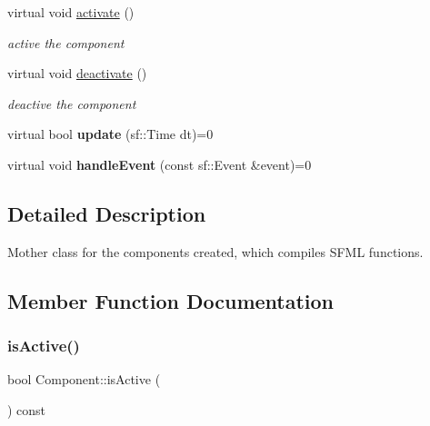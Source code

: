 \begin{DoxyCompactItemize}
\mbox{\label{classComponent_aaab29ea159109b4d0f63e9c519be6139}} 
virtual void \hyperlink{classComponent_aaab29ea159109b4d0f63e9c519be6139}{activate} ()
\begin{DoxyCompactList}\small\item\em active the component \end{DoxyCompactList}\item 
\mbox{\label{classComponent_aa4d1e5e0656ed03f7ff469db25f65053}} 
virtual void \hyperlink{classComponent_aa4d1e5e0656ed03f7ff469db25f65053}{deactivate} ()
\begin{DoxyCompactList}\small\item\em deactive the component \end{DoxyCompactList}\item 
\mbox{\label{classComponent_a090d3bc2747d4538799a1f92599ec899}} 
virtual bool {\bfseries update} (sf\+::\+Time dt)=0
\item 
\mbox{\label{classComponent_a75ed67b03624574c7c45a26eda11a46e}} 
virtual void {\bfseries handle\+Event} (const sf\+::\+Event \&event)=0
\end{DoxyCompactItemize}


\subsection{Detailed Description}
Mother class for the components created, which compiles S\+F\+ML functions. 

\subsection{Member Function Documentation}
\mbox{\label{classComponent_ad9a1fae6416df7f295c603483f15ce4a}} 
\subsubsection{\texorpdfstring{is\+Active()}{isActive()}}
{\footnotesize\ttfamily bool Component\+::is\+Active (\begin{DoxyParamCaption}{ }\end{DoxyParamCaption}) const\hspace{0.3cm}{\ttfamily [virtual]}}



